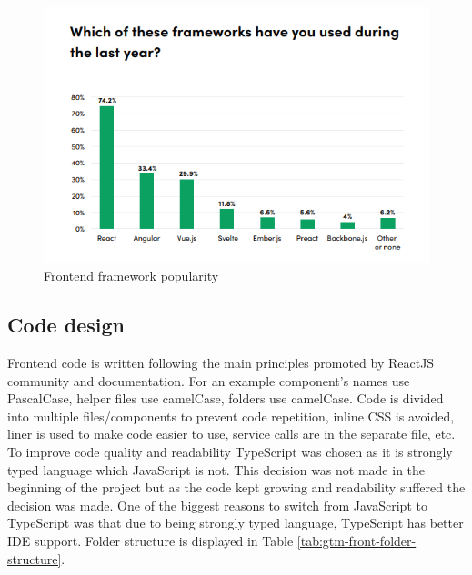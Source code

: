 \begin{figure}[h]
    \includegraphics[width=\textwidth]{figures/frontend_framework_popularity}
    \caption{Frontend framework popularity~\cite{state-of-frontend-report}}
    \label{fig:frontend-framework-popularity}
\end{figure}

\subsection{Code design}\label{subsec:code-design}
Frontend code is written following the main principles promoted by ReactJS community and documentation.
For an example component's names use PascalCase, helper files use camelCase, folders use camelCase.
Code is divided into multiple files/components to prevent code repetition, inline CSS is avoided, liner is used to make code easier to use, service calls are in the separate file, etc.
To improve code quality and readability TypeScript was chosen as it is strongly typed language which JavaScript is not.
This decision was not made in the beginning of the project but as the code kept growing and readability suffered the decision was made.
One of the biggest reasons to switch from JavaScript to TypeScript was that due to being strongly typed language,
TypeScript has better IDE support.
Folder structure is displayed in Table
\ref{tab:gtm-front-folder-structure}.

